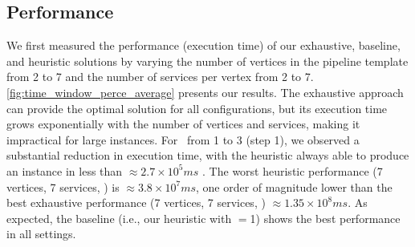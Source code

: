     \subsection{Performance}\label{subsec:experiments_performance}
    We first measured the performance (execution time) of our exhaustive, baseline, and heuristic solutions by varying the number of vertices in the pipeline template from 2 to 7 and the number of services per vertex from 2 to 7. \cref{fig:time_window_perce_average} presents our results.
    The exhaustive approach can provide the optimal solution for all configurations, but its execution time grows exponentially with the number of vertices and services, making it impractical for large instances. For \windowsize\ from 1 to 3 (step 1), we observed a substantial reduction in execution time, with the heuristic always able to produce an instance in less than $\approx2.7\times10^5ms$ . The worst heuristic performance (7 vertices, 7 services, ) is $\approx3.8\times10^7ms$, one order of magnitude lower than the best exhaustive performance (7 vertices, 7 services, ) $\approx1.35\times10^8ms$. {\color{OurColor} As expected, the baseline (i.e., our heuristic with \windowsize$=$1) shows the best performance in all settings.}
